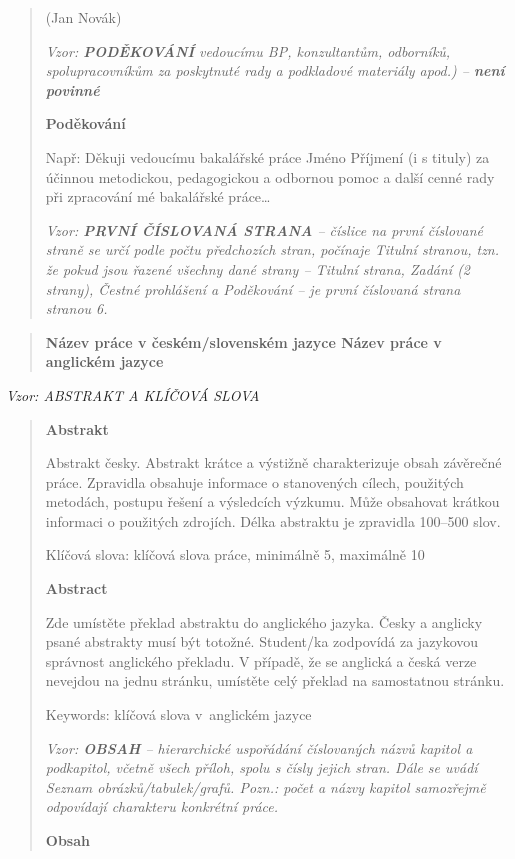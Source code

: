 \documentclass[
]{article}
\begin{document}
\begin{quote}
  (Jan Novák)

  \newpage
  \thispagestyle{empty}
  \emph{Vzor: \textbf{PODĚKOVÁNÍ} vedoucímu BP, konzultantům, odborníků,
    spolupracovníkům za poskytnuté rady a podkladové materiály apod.) --
    \textbf{není povinné}}

  \textbf{Poděkování}

  Např: Děkuji vedoucímu bakalářské práce Jméno Příjmení (i s tituly) za
  účinnou metodickou, pedagogickou a odbornou pomoc a další cenné rady při
  zpracování mé bakalářské práce\ldots{}

  \newpage
  \emph{Vzor: \textbf{PRVNÍ ČÍSLOVANÁ STRANA} -- číslice na první
    číslované straně se určí podle počtu předchozích stran, počínaje Titulní
    stranou, tzn. že pokud jsou řazené všechny dané strany -- Titulní
    strana, Zadání (2 strany), Čestné prohlášení a Poděkování -- je první
    číslovaná strana stranou 6.}
\end{quote}

\begin{quote}
  \textbf{Název práce v českém/slovenském jazyce Název práce v anglickém
    jazyce}
\end{quote}

\emph{Vzor: ABSTRAKT A KLÍČOVÁ SLOVA}

\begin{quote}
  \textbf{Abstrakt}

  Abstrakt česky. Abstrakt krátce a výstižně charakterizuje obsah
  závěrečné práce. Zpravidla obsahuje informace o stanovených cílech,
  použitých metodách, postupu řešení a výsledcích výzkumu. Může obsahovat
  krátkou informaci o použitých zdrojích. Délka abstraktu je zpravidla
  100--500 slov.

  Klíčová slova: klíčová slova práce, minimálně 5, maximálně 10

  \textbf{Abstract}

  Zde umístěte překlad abstraktu do anglického jazyka. Česky a anglicky
  psané abstrakty musí být totožné. Student/ka zodpovídá za jazykovou
  správnost anglického překladu. V případě, že se anglická a česká verze
  nevejdou na jednu stránku, umístěte celý překlad na samostatnou stránku.

  Keywords: klíčová slova v~anglickém jazyce

  \newpage
  \emph{Vzor: \textbf{OBSAH} -- hierarchické uspořádání číslovaných názvů
    kapitol a podkapitol, včetně všech příloh, spolu s čísly jejich stran.
    Dále se uvádí Seznam obrázků/tabulek/grafů. Pozn.: počet a názvy kapitol
    samozřejmě odpovídají charakteru konkrétní práce.}

  \textbf{Obsah}
\end{quote}
\end{document}
